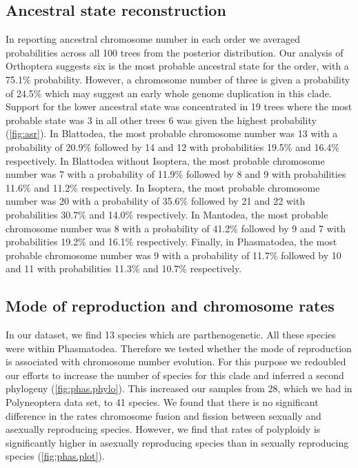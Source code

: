\subsection{Ancestral state reconstruction}
In reporting ancestral chromosome number in each order we averaged probabilities across all 100 trees from the posterior distribution. 
Our analysis of Orthoptera suggests six is the most probable ancestral state for the order, with a 75.1\% probability.
However, a chromosome number of three is given a probability of 24.5\% which may suggest an early whole genome duplication in this clade.
Support for the lower ancestral state was concentrated in 19 trees where the most probable state was 3 in all other trees 6 was given the highest probability (\cref{fig:asr}). 
In Blattodea, the most probable chromosome number was 13 with a probability of 20.9\% followed by 14 and 12 with probabilities 19.5\% and 16.4\% respectively. 
In Blattodea without Isoptera, the most probable chromosome number was 7 with a probability of 11.9\% followed by 8 and 9 with probabilities 11.6\% and 11.2\% respectively.
In Isoptera, the most probable chromosome number was 20 with a probability of 35.6\% followed by 21 and 22 with probabilities 30.7\% and 14.0\% respectively.
In Mantodea, the most probable chromosome number was 8 with a probability of 41.2\% followed by 9 and 7 with probabilities 19.2\% and 16.1\% respectively.
Finally, in Phasmatodea, the most probable chromosome number was 9 with a probability of 11.7\% followed by 10 and 11 with probabilities 11.3\% and 10.7\% respectively.

\subsection{Mode of reproduction and chromosome rates}
In our dataset, we find 13 species which are parthenogenetic. 
All these species were within Phasmatodea.
Therefore we tested whether the mode of reproduction is associated with chromosome number evolution. 
For this purpose we redoubled our efforts to increase the number of species for this clade and inferred a second phylogeny (\cref{fig:phas.phylo}).
This increased our samples from 28, which we had in Polyneoptera data set, to 41 species. 
We found that there is no significant difference in the rates chromosome fusion and fission between sexually and asexually reproducing species.
However, we find that rates of polyploidy is significantly higher in asexually reproducing species than in sexually reproducing species (\cref{fig:phas.plot}).